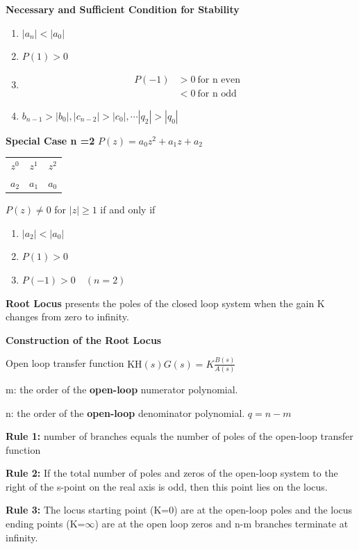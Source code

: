

\textbf{Necessary and Sufficient Condition for Stability} \newline

\begin{enumerate}
\item $|a_n| < |a_0|$ 
\item $P(1) > 0$
\item \begin{align*}
P(-1) & > 0 \ \text{for n even } \\
& < 0 \ \text{for n odd}
\end{align*}
\item $b_{n-1}> |b_0|, |c_{n-2}|>|c_0|, \cdots |q_2| > |q_0|$
\end{enumerate}

\textbf{Special Case n =2} \newline 
$P(z) =a_0z^2+a_1z+a_2$ \newline 
\begin{tabular}{c c c}
$z^0$ & $z^1$& $z^2$ \\
$a_2$ & $a_1$ & $a_0$
\end{tabular} \newline
$P(z) \neq 0$ for $|z| \geq 1$ if and only if 
\begin{enumerate}
\item $|a_2| < |a_0|$
\item $P(1) > 0$
\item $P(-1) > 0 \quad (n=2)$
\end{enumerate}

 \textbf{Root Locus} presents the poles of the closed loop system when the gain K changes from zero to infinity.

 \textbf{Construction of the Root Locus}

 Open loop transfer function
 $ \displaystyle \text{KH}\left( s \right)G\left( s \right) = K\frac{B(s)}{A(s)}$

m: the order of the \textbf{open-loop} numerator polynomial.

 n: the order of the \textbf{open-loop} denominator polynomial. $q=n-m$

 \textbf{Rule 1:} number of branches equals the number of poles of the
 open-loop transfer function

 \textbf{Rule 2:} If the total number of poles and zeros of the open-loop
 system to the right of the s-point on the real axis is odd, then this
 point lies on the locus.

\textbf{Rule 3:} The locus starting point (K=0) are at the open-loop
 poles and the locus ending points (K=$\infty$) are at the open loop zeros and
 n-m branches terminate at infinity.

